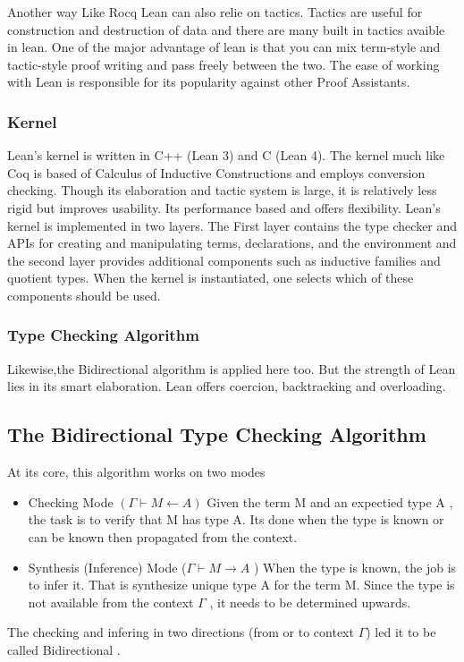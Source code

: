 \documentclass[12pt]{article}
\begin{document}
Another way Like Rocq Lean can also relie on tactics. Tactics are useful for construction and destruction of data and there are many built in tactics avaible in lean. One of the major advantage of lean 
is that you can mix term-style and tactic-style proof writing and pass freely between the two. 
The ease of working with Lean is responsible for its popularity against other Proof Assistants.\cite{lean_theorem_proving}

\subsubsection{Kernel}
Lean's kernel is written in C++ (Lean 3) and C (Lean 4). The kernel much like Coq is based of Calculus of Inductive Constructions and employs conversion checking. Though its elaboration and tactic system is large, it is relatively less rigid but improves usability. Its performance based and offers flexibility.
Lean's kernel is implemented in two layers. The First layer contains the
type checker and APIs for creating and manipulating terms, declarations, and
the environment and the second layer provides additional components such as inductive families and quotient types. When the kernel is
instantiated, one selects which of these components should be used.
\cite{Lean}
\subsubsection{Type Checking Algorithm}
Likewise,the Bidirectional algorithm is applied here too. But the strength of Lean lies in its smart elaboration. Lean offers coercion, backtracking and overloading. 

\subsection{The Bidirectional Type Checking Algorithm }

At its core, this algorithm works on two modes 
\begin{itemize}
    \item Checking Mode $(\Gamma \vdash M \leftarrow A )$ Given the term M and an expectied type A , the task is to verify that M has type A. Its done when the type is known or can be known then propagated from the context.
    \item Synthesis (Inference) Mode  ($\Gamma \vdash M \rightarrow A$ ) When the type is known, the job is to infer it. That is synthesize unique type A for the term M. Since the type is not available from the context $\Gamma$ , it needs to be determined upwards.
    
\end{itemize}
The checking and infering in two directions (from or to context $\Gamma$) led it to be called Bidirectional .
\\
\end{document}
